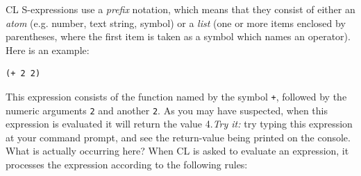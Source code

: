 \documentclass [11pt]{book}
\begin{document}
CL S-expressions use a  \emph{prefix} notation, which means that they consist of either an \emph{atom} (e.g.  number, text string, symbol) or a \emph{list} (one or more items enclosed by parentheses, where the
	  first item is taken as a symbol which names an
	  operator). Here is an example: 

\begin{verbatim}(+ 2 2)
\end{verbatim}This expression consists of the function named by the symbol \texttt{+}, followed by the numeric arguments \texttt{2} and another \texttt{2}. As you may have suspected, when this expression is
evaluated it will return the value 4.\emph{Try it: }try typing this expression at your command prompt, and see
the return-value being printed on the console. What is actually
occurring here? When CL is asked to evaluate an expression, it
processes the expression according to the following rules:
\end{document}

